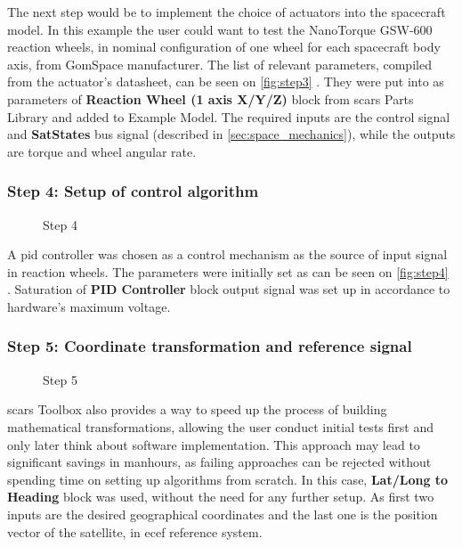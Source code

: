             The next step would be to implement the choice of actuators into the spacecraft model. In this example the user could want to test the NanoTorque GSW-600 reaction wheels, in nominal configuration of one wheel for each spacecraft body axis, from GomSpace manufacturer. The list of relevant parameters, compiled from the actuator's datasheet, can be seen on \autoref{fig:step3} . They were put into as parameters of \textbf{Reaction Wheel (1 axis X/Y/Z)} block from \ac{scars} Parts Library and added to Example Model. The required inputs are the control signal and \textbf{SatStates} bus signal (described in \autoref{sec:space_mechanics}), while the outputs are torque and wheel angular rate.

        
        \subsubsection*{Step 4: Setup of control algorithm}
            \begin{figure}[H]
                \centering
                \qquad
                \caption{Step 4}%
                \label{fig:step4}%
            \end{figure}
            A \ac{pid} controller was chosen as a control mechanism as the source of input signal in reaction wheels. The parameters were initially set as can be seen on \autoref{fig:step4} . Saturation of \textbf{PID Controller} block output signal was set up in accordance to hardware's maximum voltage.

        \subsubsection*{Step 5: Coordinate transformation and reference signal}
            \begin{figure}[H]
                \centering
                \caption{Step 5}%
                \label{fig:step5}%
            \end{figure}
            \ac{scars} Toolbox also provides a way to speed up the process of building mathematical transformations, allowing the user conduct initial tests first and only later think about software implementation. This approach may lead to significant savings in manhours, as failing approaches can be rejected without spending time on setting up algorithms from scratch. In this case, \textbf{Lat/Long to Heading} block was used, without the need for any further setup. As first two inputs are the desired geographical coordinates and the last one is the position vector of the satellite, in \ac{ecef} reference system. 

